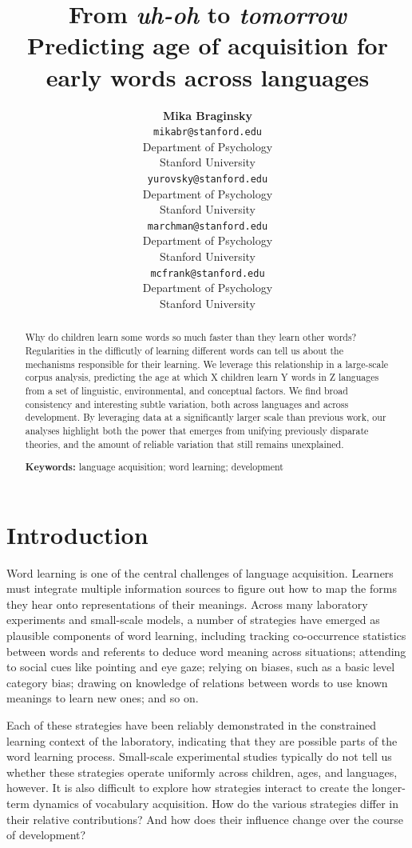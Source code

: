 \documentclass[10pt, letterpaper]{article}
\title{From \emph{uh-oh} to \emph{tomorrow}\\Predicting age of acquisition for
early words across languages}
\author{{\large \bf Mika Braginsky} \\ \texttt{mikabr@stanford.edu} \\ Department of Psychology \\ Stanford University \And {\large \bf Daniel Yurovsky} \\ \texttt{yurovsky@stanford.edu} \\ Department of Psychology \\ Stanford University \And {\large \bf Virginia A. Marchman} \\ \texttt{marchman@stanford.edu} \\ Department of Psychology \\ Stanford University \And {\large \bf Michael C. Frank} \\ \texttt{mcfrank@stanford.edu} \\ Department of Psychology \\ Stanford University}
\begin{document}
\maketitle

\begin{abstract}
Why do children learn some words so much faster than they learn other
words? Regularities in the difficutly of learning different words can
tell us about the mechanisms responsible for their learning. We leverage
this relationship in a large-scale corpus analysis, predicting the age
at which X children learn Y words in Z languages from a set of
linguistic, environmental, and conceptual factors. We find broad
consistency and interesting subtle variation, both across languages and
across development. By leveraging data at a significantly larger scale
than previous work, our analyses highlight both the power that emerges
from unifying previously disparate theories, and the amount of reliable
variation that still remains unexplained.

\textbf{Keywords:}
language acquisition; word learning; development
\end{abstract}

\section{Introduction}\label{introduction}

Word learning is one of the central challenges of language acquisition.
Learners must integrate multiple information sources to figure out how
to map the forms they hear onto representations of their meanings.
Across many laboratory experiments and small-scale models, a number of
strategies have emerged as plausible components of word learning,
including tracking co-occurrence statistics between words and referents
to deduce word meaning across situations; attending to social cues like
pointing and eye gaze; relying on biases, such as a basic level category
bias; drawing on knowledge of relations between words to use known
meanings to learn new ones; and so on.

Each of these strategies have been reliably demonstrated in the
constrained learning context of the laboratory, indicating that they are
possible parts of the word learning process. Small-scale experimental
studies typically do not tell us whether these strategies operate
uniformly across children, ages, and languages, however. It is also
difficult to explore how strategies interact to create the longer-term
dynamics of vocabulary acquisition. How do the various strategies differ
in their relative contributions? And how does their influence change
over the course of development?
\end{document}
